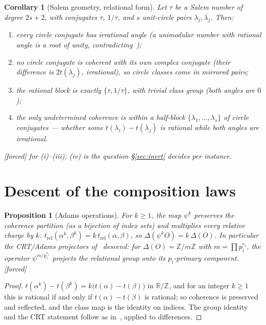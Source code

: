 \documentclass[11pt]{article}
\theoremstyle{plain}
\newtheorem{proposition}[theorem]{Proposition}
\newtheorem{corollary}[theorem]{Corollary}
\theoremstyle{definition}
\theoremstyle{remark}
\newcommand{\Z}{\mathbb{Z}}
\newcommand{\R}{\mathbb{R}}
\newcommand{\F}{\textnormal{[forced]}}
\begin{document}
\begin{corollary}[Salem geometry, relational form]\label{cor:salemgeom}
Let $\tau$ be a Salem number of degree $2s+2$, with conjugates $\tau$, $1/\tau$,
and $s$ unit-circle pairs $\lambda_j,\overline{\lambda_j}$. Then:
\begin{enumerate}
\item[(i)] every circle conjugate has irrational angle (a unimodular number with
  rational angle is a root of unity, contradicting~\cite[Lem.~6.1]{CMC});
\item[(ii)] no circle conjugate is coherent with its own complex conjugate
  (their difference is $2t(\lambda_j)$, irrational), so circle classes come in
  mirrored pairs;
\item[(iii)] the rational block is exactly $\{\tau,1/\tau\}$, with trivial class
  group (both angles are $0$);
\item[(iv)] the only undetermined coherence is \emph{within} a half-block
  $\{\lambda_1,\dots,\lambda_s\}$ of circle conjugates --- whether some
  $t(\lambda_i)-t(\lambda_j)$ is rational while both angles are irrational.
\end{enumerate}
\F{} for (i)--(iii); (iv) is the question \S\ref{sec:inert} decides per instance.
\end{corollary}

\section{Descent of the composition laws}\label{sec:descent}

\begin{proposition}[Adams operations]\label{prop:adams}
For $k\ge1$, the map $\psi^k$ preserves the coherence partition (as a bijection of
index sets) and multiplies every relative charge by $k$:
$t_{\mathrm{rel}}(\alpha^k,\beta^k)=k\,t_{\mathrm{rel}}(\alpha,\beta)$, so
$\Delta(\psi^kO)=k\,\Delta(O)$. In particular the CRT/Adams projectors
of~\cite[Thm.~3.3]{CMC} descend: for $\Delta(O)=\Z/m\Z$ with
$m=\prod p_i^{e_i}$, the operator $\psi^{m/p_i^{e_i}}$ projects the relational
group onto its $p_i$-primary component. \F
\end{proposition}

\begin{proof}
$t(\alpha^k)-t(\beta^k)=k\bigl(t(\alpha)-t(\beta)\bigr)$ in $\R/\Z$, and for an
integer $k\ge1$ this is rational if and only if $t(\alpha)-t(\beta)$ is rational;
so coherence is preserved and reflected, and the class map is the identity on
indices. The group identity and the CRT statement follow as
in~\cite[Thm.~3.3]{CMC}, applied to differences.
\end{proof}
\end{document}
